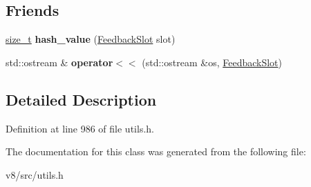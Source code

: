 \subsection*{Friends}
\begin{DoxyCompactItemize}
\item 
\mbox{\label{classv8_1_1internal_1_1FeedbackSlot_af6413d6db5571223234d528dfa1c7bda}} 
\mbox{\hyperlink{classsize__t}{size\+\_\+t}} {\bfseries hash\+\_\+value} (\mbox{\hyperlink{classv8_1_1internal_1_1FeedbackSlot}{Feedback\+Slot}} slot)
\item 
\mbox{\label{classv8_1_1internal_1_1FeedbackSlot_a43b99414940776ad22aa57f0eb89b56b}} 
std\+::ostream \& {\bfseries operator$<$$<$} (std\+::ostream \&os, \mbox{\hyperlink{classv8_1_1internal_1_1FeedbackSlot}{Feedback\+Slot}})
\end{DoxyCompactItemize}


\subsection{Detailed Description}


Definition at line 986 of file utils.\+h.



The documentation for this class was generated from the following file\+:\begin{DoxyCompactItemize}
\item 
v8/src/utils.\+h\end{DoxyCompactItemize}
